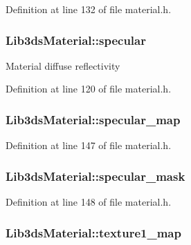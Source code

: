 Definition at line 132 of file material.\-h.

\hypertarget{struct_lib3ds_material_a26df3a7fb91805a9a424dfdb850f02fd}{
\subsubsection[{specular}]{ Lib3ds\-Material\-::specular}}\label{struct_lib3ds_material_a26df3a7fb91805a9a424dfdb850f02fd}
Material diffuse reflectivity 

Definition at line 120 of file material.\-h.

\hypertarget{struct_lib3ds_material_a865e55ffb621f4b42239f674704505a3}{
\subsubsection[{specular\-\_\-map}]{ Lib3ds\-Material\-::specular\-\_\-map}}\label{struct_lib3ds_material_a865e55ffb621f4b42239f674704505a3}


Definition at line 147 of file material.\-h.

\hypertarget{struct_lib3ds_material_a9f04eb1b061b5b05468c0ed05d3c87a7}{
\subsubsection[{specular\-\_\-mask}]{ Lib3ds\-Material\-::specular\-\_\-mask}}\label{struct_lib3ds_material_a9f04eb1b061b5b05468c0ed05d3c87a7}


Definition at line 148 of file material.\-h.

\hypertarget{struct_lib3ds_material_a9a79faa2ba81a32506788f71b81c9ca7}{
\subsubsection[{texture1\-\_\-map}]{ Lib3ds\-Material\-::texture1\-\_\-map}}\label{struct_lib3ds_material_a9a79faa2ba81a32506788f71b81c9ca7}


